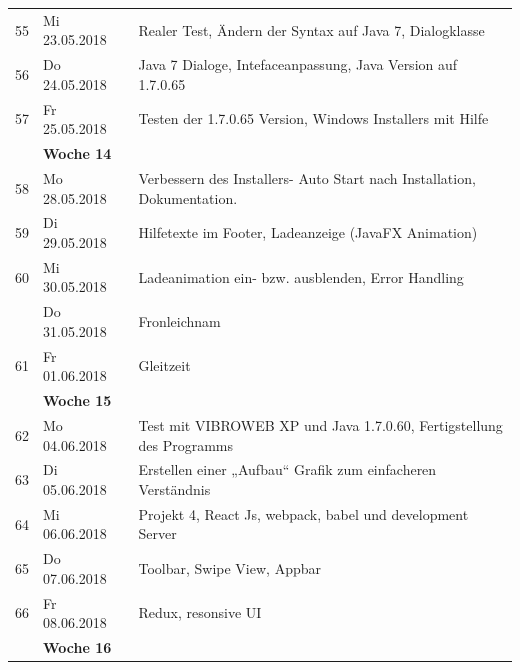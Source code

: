 \documentclass{article}
\begin{document}
{\begin{tabular}{l|p{2.5cm}|p{15cm}}
		
		55 & Mi 23.05.2018		 & 
		Realer Test, Ändern der Syntax auf Java 7, Dialogklasse\\

		56 & Do 24.05.2018  & 
		Java 7 Dialoge, Intefaceanpassung, Java Version auf 1.7.0.65\\

		57 & Fr 25.05.2018 & 
		Testen der 1.7.0.65 Version, Windows Installers mit Hilfe\\
	

	
			

			& \textbf{Woche 14}&\\

			
			
			58 & Mo 28.05.2018	  & 
			Verbessern des Installers- Auto Start nach Installation, Dokumentation.\\

			59 & Di 29.05.2018	  & 
			Hilfetexte im Footer, Ladeanzeige (JavaFX Animation)\\

			60 & Mi 30.05.2018			 & 
			 Ladeanimation ein- bzw. ausblenden, Error Handling\\

			 & Do 31.05.2018  & 
			Fronleichnam\\

			61 & Fr 01.06.2018 & 
			Gleitzeit\\

			

			& \textbf{Woche 15}&\\

			
			
			62 & Mo 04.06.2018	  & 
			Test mit VIBROWEB XP und Java 1.7.0.60, Fertigstellung des Programms\\

			63 & Di 05.06.2018	  & 
			Erstellen einer „Aufbau“ Grafik zum einfacheren Verständnis\\

			64 & Mi 06.06.2018			 & 
			 Projekt 4, React Js, webpack, babel und development Server\\

			65 & Do 07.06.2018  & 
			Toolbar, Swipe View, Appbar\\

			66 & Fr 08.06.2018 & 
			Redux, resonsive UI\\

			

			& \textbf{Woche 16}&\\


\end{tabular}}
\end{document}
